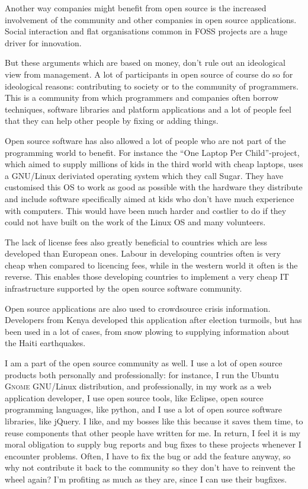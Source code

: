 \documentclass{article}
\begin{document}
Another way companies might benefit from open source is the increased
involvement of the community and other companies in open source applications.
Social interaction and flat organisations common in FOSS projects are a huge
driver for innovation. \cite{conway09} 

But these arguments which are based on money, don't rule out an ideological
view from management. A lot of participants in open source of course do so for
ideological reasons: contributing to society or to the community of
programmers. This is a community from which programmers and companies often
borrow techniques, software libraries and platform applications and a lot of
people feel that they can help other people by fixing or adding things.

Open source software has also allowed a lot of people who are not part of the
programming world to benefit. For instance the ``One Laptop Per
Child''-project, which aimed to supply millions of kids in the third world with
cheap laptops, uses a GNU/Linux deriviated operating system which they call
Sugar. They have customised this OS to work as good as possible with the
hardware they distribute and include software specifically aimed at kids who
don't have much experience with computers.\cite{sugar} This would have been
much harder and costlier to do if they could not have built on the work of the
Linux OS and many volunteers. 

The lack of license fees also greatly beneficial to countries which are less
developed than European ones. Labour in developing countries often is very
cheap when compared to licencing fees, while in the western world it often is
the reverse. This enables those developing countries to implement a very cheap
IT infrastructure supported by the open source software
community.\cite{ghosh03}

Open source applications are also used to crowdsource crisis information.
Developers from Kenya developed this application after election
turmoils\cite{ushahidi}, but has been used in a lot of cases, from snow plowing
to supplying information about the Haiti earthquakes.\cite{shirkyTED}

I am a part of the open source community as well. I use a lot of open source
products both personally and professionally: for instance, I run the Ubuntu
\textsc{Gnome} GNU/Linux distribution, and professionally, in my work as a web
application developer, I use open source tools, like Eclipse, open source
programming languages, like python, and I use a lot of open source software
libraries, like jQuery. I like, and my bosses like this because it saves them
time, to reuse components that other people have written for me. In return,
I feel it is my moral obligation to supply bug reports and bug fixes to these
projects whenever I encounter problems. Often, I have to fix the bug or add the
feature anyway, so why not contribute it back to the community so they don't
have to reinvent the wheel again? I'm profiting as much as they are, since
I can use their bugfixes.
\end{document}
